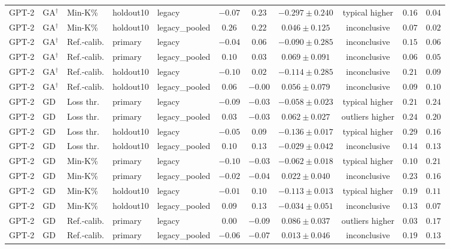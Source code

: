 \begin{table}[t]
\begin{tabular*}{\textwidth}{@{\extracolsep{\fill}}lllllcccccc@{}}
GPT-2 & GA$^{\dagger}$ & Min-K\% & holdout10 & legacy & $-0.07$ & $0.23$ & $-0.297 \pm 0.240$ & typical higher & $0.16$ & $0.04$ \\
GPT-2 & GA$^{\dagger}$ & Min-K\% & holdout10 & legacy\_pooled & $0.26$ & $0.22$ & $0.046 \pm 0.125$ & inconclusive & $0.07$ & $0.02$ \\
GPT-2 & GA$^{\dagger}$ & Ref.-calib. & primary & legacy & $-0.04$ & $0.06$ & $-0.090 \pm 0.285$ & inconclusive & $0.15$ & $0.06$ \\
GPT-2 & GA$^{\dagger}$ & Ref.-calib. & primary & legacy\_pooled & $0.10$ & $0.03$ & $0.069 \pm 0.091$ & inconclusive & $0.06$ & $0.05$ \\
GPT-2 & GA$^{\dagger}$ & Ref.-calib. & holdout10 & legacy & $-0.10$ & $0.02$ & $-0.114 \pm 0.285$ & inconclusive & $0.21$ & $0.09$ \\
GPT-2 & GA$^{\dagger}$ & Ref.-calib. & holdout10 & legacy\_pooled & $0.06$ & $-0.00$ & $0.056 \pm 0.079$ & inconclusive & $0.09$ & $0.10$ \\
GPT-2 & GD & Loss thr. & primary & legacy & $-0.09$ & $-0.03$ & $-0.058 \pm 0.023$ & typical higher & $0.21$ & $0.24$ \\
GPT-2 & GD & Loss thr. & primary & legacy\_pooled & $0.03$ & $-0.03$ & $0.062 \pm 0.027$ & outliers higher & $0.24$ & $0.20$ \\
GPT-2 & GD & Loss thr. & holdout10 & legacy & $-0.05$ & $0.09$ & $-0.136 \pm 0.017$ & typical higher & $0.29$ & $0.16$ \\
GPT-2 & GD & Loss thr. & holdout10 & legacy\_pooled & $0.10$ & $0.13$ & $-0.029 \pm 0.042$ & inconclusive & $0.14$ & $0.13$ \\
GPT-2 & GD & Min-K\% & primary & legacy & $-0.10$ & $-0.03$ & $-0.062 \pm 0.018$ & typical higher & $0.10$ & $0.21$ \\
GPT-2 & GD & Min-K\% & primary & legacy\_pooled & $-0.02$ & $-0.04$ & $0.022 \pm 0.040$ & inconclusive & $0.23$ & $0.16$ \\
GPT-2 & GD & Min-K\% & holdout10 & legacy & $-0.01$ & $0.10$ & $-0.113 \pm 0.013$ & typical higher & $0.19$ & $0.11$ \\
GPT-2 & GD & Min-K\% & holdout10 & legacy\_pooled & $0.09$ & $0.13$ & $-0.034 \pm 0.051$ & inconclusive & $0.13$ & $0.07$ \\
GPT-2 & GD & Ref.-calib. & primary & legacy & $0.00$ & $-0.09$ & $0.086 \pm 0.037$ & outliers higher & $0.03$ & $0.17$ \\
GPT-2 & GD & Ref.-calib. & primary & legacy\_pooled & $-0.06$ & $-0.07$ & $0.013 \pm 0.046$ & inconclusive & $0.19$ & $0.13$ \\

\end{tabular*}
\end{table}
